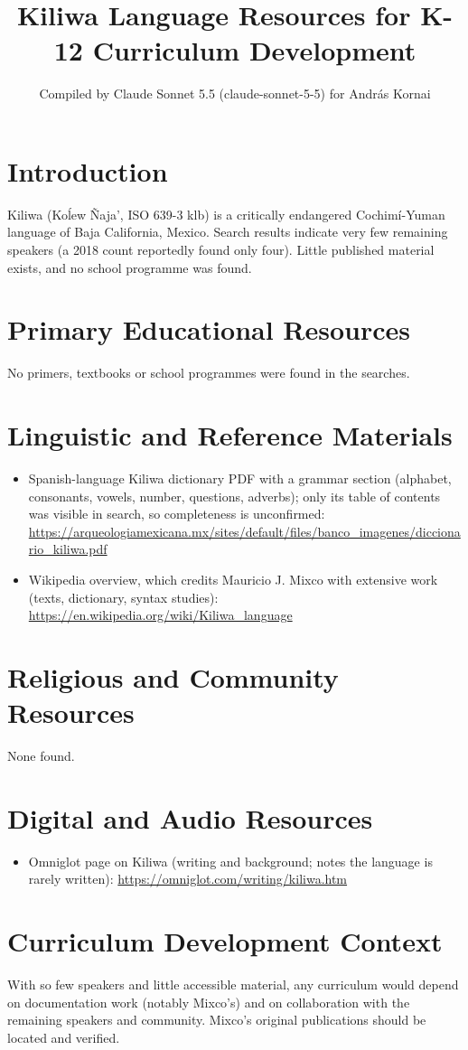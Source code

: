 \documentclass[12pt]{article}
\title{Kiliwa Language Resources for K-12 Curriculum Development}
\author{Compiled by Claude Sonnet 5.5 (claude-sonnet-5-5) for Andr\'as Kornai}
\date{}
\begin{document}
\maketitle

\section{Introduction}
Kiliwa (Ko\'lew \~Naja', ISO 639-3 klb) is a critically endangered Cochim\'i-Yuman language of Baja California, Mexico. Search results indicate very few remaining speakers (a 2018 count reportedly found only four). Little published material exists, and no school programme was found.

\section{Primary Educational Resources}
No primers, textbooks or school programmes were found in the searches.

\section{Linguistic and Reference Materials}
\begin{itemize}
\item Spanish-language Kiliwa dictionary PDF with a grammar section (alphabet, consonants, vowels, number, questions, adverbs); only its table of contents was visible in search, so completeness is unconfirmed: \url{https://arqueologiamexicana.mx/sites/default/files/banco_imagenes/diccionario_kiliwa.pdf}
\item Wikipedia overview, which credits Mauricio J. Mixco with extensive work (texts, dictionary, syntax studies): \url{https://en.wikipedia.org/wiki/Kiliwa_language}
\end{itemize}

\section{Religious and Community Resources}
None found.

\section{Digital and Audio Resources}
\begin{itemize}
\item Omniglot page on Kiliwa (writing and background; notes the language is rarely written): \url{https://omniglot.com/writing/kiliwa.htm}
\end{itemize}

\section{Curriculum Development Context}
With so few speakers and little accessible material, any curriculum would depend on documentation work (notably Mixco's) and on collaboration with the remaining speakers and community. Mixco's original publications should be located and verified.
\end{document}
